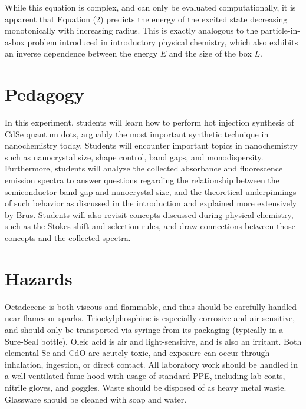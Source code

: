 \documentclass[journal = jceda8, manuscript = article]{achemso}
\begin{document}
While this equation is complex, and can only be evaluated computationally, it is
apparent that Equation (2) predicts the energy of the excited state decreasing
monotonically with increasing radius. This is exactly analogous to the
particle-in-a-box problem introduced in introductory physical chemistry, which
also exhibits an inverse dependence between the energy $E$ and the size of the
box $L$.

\section{Pedagogy}


In this experiment, students will learn how to perform hot injection synthesis
of CdSe quantum dots, arguably the most important synthetic technique in
nanochemistry today. Students will encounter important topics in nanochemistry
such as nanocrystal size, shape control, band gaps, and monodispersity.
Furthermore, students will analyze the collected absorbance and fluorescence
emission spectra to answer questions regarding the relationship between the
semiconductor band gap and nanocrystal size, and the theoretical underpinnings
of such behavior as discussed in the introduction and explained more extensively
by Brus. \cite{exciton_energy} Students will also revisit concepts
discussed during physical chemistry, such as the Stokes shift and selection
rules, and draw connections between those concepts and the collected spectra.

\section{Hazards}


Octadecene is both viscous and flammable, and thus should be carefully handled
near flames or sparks. Trioctylphosphine is especially corrosive and
air-sensitive, and should only be transported via syringe from its packaging
(typically in a Sure-Seal bottle). Oleic acid is air and light-sensitive, and is
also an irritant. Both elemental Se and CdO are acutely toxic, and exposure can
occur through inhalation, ingestion, or direct contact. All laboratory work
should be handled in a well-ventilated fume hood with usage of standard PPE,
including lab coats, nitrile gloves, and goggles. Waste should be disposed of as
heavy metal waste. Glassware should be cleaned with soap and water.
\end{document}
